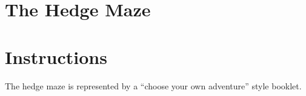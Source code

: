 \documentclass[white]{gl2018}
\begin{document}
\name{\wLabyrinth{}}
\section*{The Hedge Maze}
\newcommand{\areastart}[1]{ \begin{huge}{\bf \#{#1}} \end{huge} \\}
\newenvironment{fromhere}{\begin{center}\begin{itshape}}{\end{itshape}\end{center}}
\newenvironment{location}[1]{\begin{minipage}{\textwidth}\areastart{#1}\\}{\end{minipage}\vspace{1in}}
\section*{Instructions}
The hedge maze is represented by a ``choose your own adventure'' style booklet. 
\end{document}
